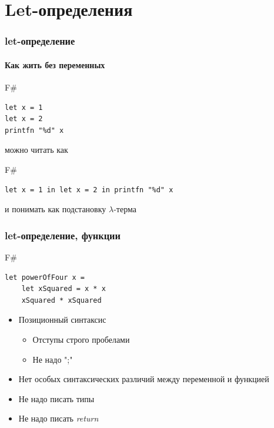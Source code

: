 \documentclass[xetex,mathserif,serif]{beamer}
\begin{document}
	\section{Let-определения}

	\begin{frame}[fragile]
		\frametitle{let-определение}
		\framesubtitle{Как жить без переменных}
		\begin{exampleblock}{F\#}
			\begin{lstlisting}
let x = 1
let x = 2
printfn "%d" x
           \end{lstlisting}
		\end{exampleblock}
		можно читать как
		\begin{exampleblock}{F\#}
			\begin{lstlisting}
let x = 1 in let x = 2 in printfn "%d" x
            \end{lstlisting}
		\end{exampleblock}
		и понимать как подстановку $\lambda$-терма
\end{frame}
		
	\begin{frame}[fragile]
		\frametitle{let-определение, функции}
		\begin{exampleblock}{F\#}
			\begin{lstlisting}
let powerOfFour x = 
    let xSquared = x * x
    xSquared * xSquared
            \end{lstlisting}
		\end{exampleblock}
		\begin{itemize}
			\item Позиционный синтаксис
			\begin{itemize}
				\item Отступы строго пробелами
				\item Не надо ";"
			\end{itemize}
			\item Нет особых синтаксических различий между переменной и функцией
			\item Не надо писать типы
			\item Не надо писать \textit{return}
		\end{itemize}
\end{frame}
\end{document}
